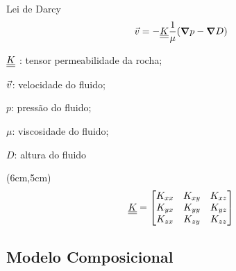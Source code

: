 \documentclass[professionalfont]{beamer}
\begin{document}
\begin{frame}{Lei de Darcy}
    \begin{equation}
        \vec{v} = -\underline{\underline{K}} \dfrac{1}{\mu} (\mbox{\boldmath$ \nabla $} p - \mbox{\boldmath$ \nabla $} D)
    \end{equation}
    
    \vspace{0.3cm}
    
    \begin{description}[]
        \item $\underline{\underline{K}}$ : tensor permeabilidade da rocha;
        \item $\vec{v}$: velocidade do fluido;
        \item $p$: pressão do fluido;
        \item $\mu$: viscosidade do fluido;
        \item $D$: altura do fluido
    \end{description}
    
    \begin{textblock*}{.5\paperwidth}(6cm,5cm)
        \begin{align*}
            \underline{\underline{K}} = 
            \begin{bmatrix}
            	K_{xx} & K_{xy} & K_{xz} \\
            	K_{yx} & K_{yy} & K_{yz} \\
            	K_{zx} & K_{zy} & K_{zz}
	        \end{bmatrix}
        \end{align*}
    \end{textblock*}
    
\end{frame}



\subsection{Modelo Composicional}
\end{document}

